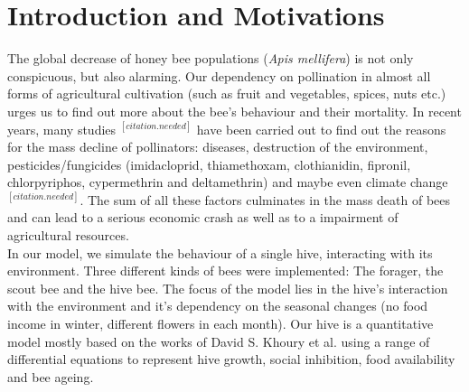 \section{Introduction and Motivations}
The global decrease of honey bee populations (\textit{Apis mellifera}) is not only conspicuous, but also alarming. Our dependency on pollination in almost all forms of agricultural cultivation (such as fruit and vegetables, spices, nuts etc.) urges us to find out more about the bee's behaviour and their mortality. In recent years, many studies $^{[citation.needed]}$ have been carried out to find out the reasons for the mass decline of pollinators: diseases, destruction of the environment, pesticides/fungicides (imidacloprid, thiamethoxam, clothianidin, fipronil, chlorpyriphos, cypermethrin and deltamethrin) and maybe even climate change $^{[citation.needed]}$. The sum of all these factors culminates in the mass death of bees and can lead to a serious economic crash as well as to a impairment of agricultural resources.\\
In our model, we simulate the behaviour of a single hive, interacting with its environment. Three different kinds of bees were implemented: The forager, the scout bee and the hive bee. The focus of the model lies in the hive's interaction with the environment and it's dependency on the seasonal changes (no food income in winter, different flowers in each month). Our hive is a quantitative model mostly based on the works of David S. Khoury et al. \cite{khoury13} using a range of differential equations to represent hive growth, social inhibition, food availability and bee ageing. 